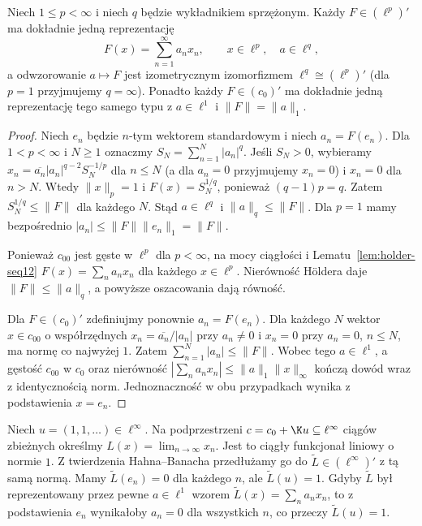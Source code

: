 \begin{twierdzenie}
\label{thm:dual-sequences12}
Niech $1\le p<\infty$ i niech $q$ będzie wykładnikiem sprzężonym.
Każdy $F\in(\ell^p)'$ ma dokładnie jedną reprezentację
\[
 F(x)=\sum_{n=1}^\infty a_nx_n,\qquad x\in\ell^p,
 \quad a\in\ell^q,
\]
a odwzorowanie $a\mapsto F$ jest izometrycznym izomorfizmem
$\ell^q\cong(\ell^p)'$ (dla $p=1$ przyjmujemy $q=\infty$).
Ponadto każdy $F\in(c_0)'$ ma dokładnie jedną reprezentację
tego samego typu z $a\in\ell^1$ i $\|F\|=\|a\|_1$.
\end{twierdzenie}
\begin{proof}
Niech $e_n$ będzie $n$-tym wektorem standardowym i niech
$a_n=F(e_n)$. Dla $1<p<\infty$ i $N\ge1$ oznaczmy
$S_N=\sum_{n=1}^N|a_n|^q$. Jeśli $S_N>0$, wybieramy
$x_n=\overline{a_n}|a_n|^{q-2}S_N^{-1/p}$
dla $n\le N$ (a dla $a_n=0$ przyjmujemy $x_n=0$)
i $x_n=0$ dla $n>N$. Wtedy
$\|x\|_p=1$ i $F(x)=S_N^{1/q}$, ponieważ
$(q-1)p=q$. Zatem $S_N^{1/q}\le\|F\|$ dla każdego $N$.
Stąd $a\in\ell^q$ i $\|a\|_q\le\|F\|$.
Dla $p=1$ mamy bezpośrednio
$|a_n|\le\|F\|\|e_n\|_1=\|F\|$.

Ponieważ $c_{00}$ jest gęste w $\ell^p$ dla $p<\infty$,
na mocy ciągłości i Lematu~\ref{lem:holder-seq12}
$F(x)=\sum_na_nx_n$ dla każdego $x\in\ell^p$.
Nierówność H\"oldera daje $\|F\|\le\|a\|_q$,
a powyższe oszacowania dają równość.

Dla $F\in(c_0)'$ zdefiniujmy ponownie $a_n=F(e_n)$.
Dla każdego $N$ wektor $x\in c_{00}$ o współrzędnych
$x_n=\overline{a_n}/|a_n|$ przy $a_n\ne0$ i
$x_n=0$ przy $a_n=0$, $n\le N$, ma normę co najwyżej $1$.
Zatem $\sum_{n=1}^N|a_n|\le\|F\|$.
Wobec tego $a\in\ell^1$, a gęstość $c_{00}$ w $c_0$
oraz nierówność $|\sum_na_nx_n|\le\|a\|_1\|x\|_\infty$
kończą dowód wraz z identycznością norm.
Jednoznaczność w obu przypadkach wynika z podstawienia $x=e_n$.
\end{proof}

\begin{przyklad}
\label{ex:linfty-dual-seq12}
Niech $u=(1,1,\ldots)\in\ell^\infty$. Na podprzestrzeni $c=c_0+\K u\subseteq\ell^\infty$
ciągów zbieżnych określmy $L(x)=\lim_{n\to\infty}x_n$.
Jest to ciągły funkcjonał liniowy o normie $1$.
Z twierdzenia Hahna--Banacha przedłużamy go do
$\widetilde L\in(\ell^\infty)'$ z tą samą normą.
Mamy $\widetilde L(e_n)=0$ dla każdego $n$, ale
$\widetilde L(u)=1$. Gdyby $\widetilde L$
był reprezentowany przez pewne $a\in\ell^1$ wzorem
$\widetilde L(x)=\sum_na_nx_n$, to z podstawienia $e_n$
wynikałoby $a_n=0$ dla wszystkich $n$, co przeczy
$\widetilde L(u)=1$.
\end{przyklad}

